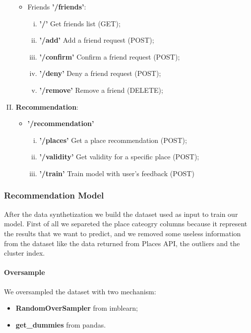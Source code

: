 \documentclass[../../main]{subfiles}
\begin{document}
\begin{enumerate}[I)]
\begin{itemize}
        \item Friends \textbf{'/friends'}:
        \begin{enumerate}[i)]
            \item \textbf{'/'} Get friends list (GET);
            \item \textbf{'/add'} Add a friend request (POST);
            \item \textbf{'/confirm'} Confirm a friend request (POST);
            \item \textbf{'/deny'} Deny a friend request (POST);
            \item \textbf{'/remove'} Remove a friend (DELETE);
        \end{enumerate}
    \end{itemize}
    \item \textbf{Recommendation}:
    \begin{itemize}
        \item \textbf{'/recommendation'}
        \begin{enumerate}[i)]
            \item \textbf{'/places'} Get a place recommendation (POST);
            \item \textbf{'/validity'} Get validity for a specific place (POST);
            \item \textbf{'/train'} Train model with user's feedback (POST)
        \end{enumerate}
    \end{itemize}
\end{enumerate}
    

    
\subsubsection{Recommendation Model}
After the data synthetization we build the dataset used as input to train our model. First of all we separeted the place cateogry columns because it represent the results that we want to predict, and we removed some useless information from the dataset like the data returned from Places API, the outliers and the cluster index.
\paragraph*{Oversample}
We oversampled the dataset with two mechanism:
\begin{itemize}
    \item \textbf{RandomOverSampler} from imblearn;
    \item \textbf{get\_dummies} from pandas.
\end{itemize}
\end{document}

